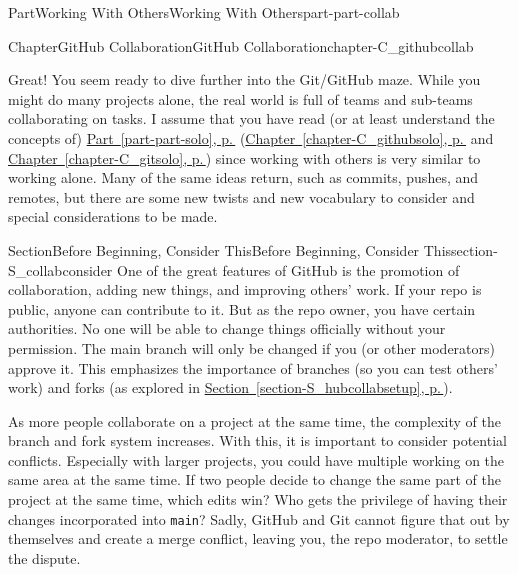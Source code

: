 \documentclass[twoside,10pt,]{book}
\newcommand{\xreffont}{\relax}
\newcommand{\mono}[1]{\texttt{#1}}
\begin{document}
\begin{partptx}{Part}{Working With Others}{}{Working With Others}{}{}{part-part-collab}
\renewcommand*{\partname}{Part}
%
\typeout{************************************************}
\typeout{************************************************}
%
\begin{chapterptx}{Chapter}{GitHub Collaboration}{}{GitHub Collaboration}{}{}{chapter-C_githubcollab}
\renewcommand*{\chaptername}{Chapter}
\begin{introduction}{}%
Great! You seem ready to dive further into the Git\slash{}GitHub maze. While you might do many projects alone, the real world is full of teams and sub-teams collaborating on tasks. I assume that you have read (or at least understand the concepts of) \hyperref[part-part-solo]{Part~{\xreffont\ref{part-part-solo}}, p.\,\pageref{part-part-solo}} (\hyperref[chapter-C_githubsolo]{Chapter~{\xreffont\ref{chapter-C_githubsolo}}, p.\,\pageref{chapter-C_githubsolo}} and \hyperref[chapter-C_gitsolo]{Chapter~{\xreffont\ref{chapter-C_gitsolo}}, p.\,\pageref{chapter-C_gitsolo}}) since working with others is very similar to working alone. Many of the same ideas return, such as commits, pushes, and remotes, but there are some new twists and new vocabulary to consider and special considerations to be made.%
\end{introduction}%
%
%
\typeout{************************************************}
\typeout{************************************************}
%
\begin{sectionptx}{Section}{Before Beginning, Consider This}{}{Before Beginning, Consider This}{}{}{section-S_collabconsider}
%
%
One of the great features of GitHub is the promotion of collaboration, adding new things, and improving others' work. If your repo is public, anyone can contribute to it. But as the repo owner, you have certain authorities. No one will be able to change things officially without your permission. The main branch will only be changed if you (or other moderators) approve it. This emphasizes the importance of branches (so you can test others' work) and forks (as explored in \hyperref[section-S_hubcollabsetup]{Section~{\xreffont\ref{section-S_hubcollabsetup}}, p.\,\pageref{section-S_hubcollabsetup}}).%
\par
As more people collaborate on a project at the same time, the complexity of the branch and fork system increases. With this, it is important to consider potential conflicts. Especially with larger projects, you could have multiple working on the same area at the same time. If two people decide to change the same part of the project at the same time, which edits win? Who gets the privilege of having their changes incorporated into \mono{main}? Sadly, GitHub and Git cannot figure that out by themselves and create a merge conflict, leaving you, the repo moderator, to settle the dispute.%

\end{sectionptx}
\end{chapterptx}
\end{partptx}
\end{document}
